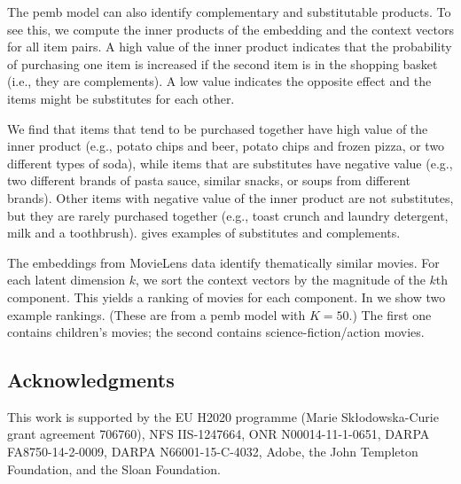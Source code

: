 \documentclass[12pt]{article}
\begin{document}
The \gls{pemb} model can also identify complementary and substitutable
products. To see this, we compute the inner products of the embedding
and the context vectors for all item pairs. A high value of the inner
product indicates that the probability of purchasing one item is
increased if the second item is in the shopping basket (i.e., they are
complements). A low value indicates the opposite effect and the items
might be substitutes for each other.

We find that items that tend to be purchased together have high value
of the inner product (e.g., potato chips and beer, potato chips and
frozen pizza, or two different types of soda), while items that are
substitutes have negative value (e.g., two different brands of pasta
sauce, similar snacks, or soups from different brands).  Other items
with negative value of the inner product are not substitutes, but they
are rarely purchased together (e.g., toast crunch and laundry
detergent, milk and a toothbrush).  
gives examples of substitutes and complements.

 The embeddings from
MovieLens data identify thematically similar movies. For each latent
dimension $k$, we sort the context vectors by the magnitude of the
$k$th component. This yields a ranking of movies for each component.
In  we show two example rankings. (These are from a 
\gls{pemb} model with $K=50$.) The first one contains children's
movies; the second contains science-fiction/action movies.

%

\subsection*{Acknowledgments}
This work is supported by the EU H2020 programme (Marie Sk\l{}odowska-Curie grant agreement 706760), NFS IIS-1247664, ONR N00014-11-1-0651, DARPA FA8750-14-2-0009, DARPA N66001-15-C-4032, Adobe, the John Templeton Foundation, and the Sloan Foundation.
\end{document}
